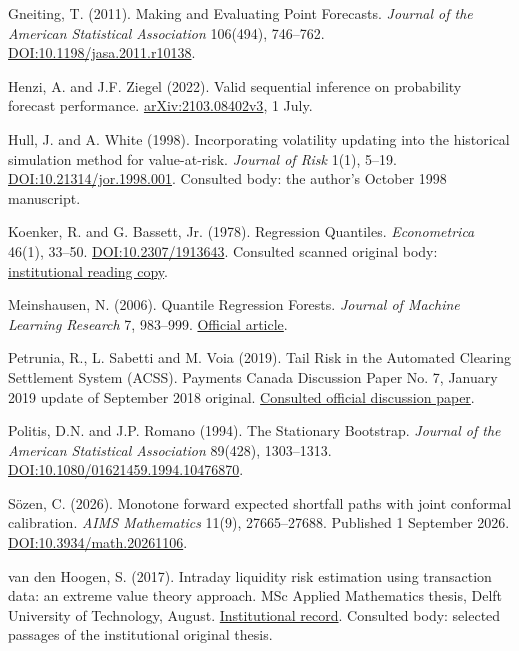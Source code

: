 \documentclass[10pt,a4paper]{article}
\begin{document}
Gneiting, T. (2011). Making and Evaluating Point Forecasts. \emph{Journal of the American Statistical Association} 106(494), 746–762. \href{https://doi.org/10.1198/jasa.2011.r10138}{DOI:10.1198/jasa.2011.r10138}.

Henzi, A. and J.F. Ziegel (2022). Valid sequential inference on probability forecast performance. \href{https://arxiv.org/abs/2103.08402v3}{arXiv:2103.08402v3}, 1 July.

Hull, J. and A. White (1998). Incorporating volatility updating into the historical simulation method for value-at-risk. \emph{Journal of Risk} 1(1), 5–19. \href{https://doi.org/10.21314/jor.1998.001}{DOI:10.21314/jor.1998.001}. Consulted body: the author's October 1998 manuscript.

Koenker, R. and G. Bassett, Jr. (1978). Regression Quantiles. \emph{Econometrica} 46(1), 33–50. \href{https://doi.org/10.2307/1913643}{DOI:10.2307/1913643}. Consulted scanned original body: \href{https://people.eecs.berkeley.edu/~jordan/sail/readings/koenker-bassett.pdf}{institutional reading copy}.

Meinshausen, N. (2006). Quantile Regression Forests. \emph{Journal of Machine Learning Research} 7, 983–999. \href{https://www.jmlr.org/papers/volume7/meinshausen06a/meinshausen06a.pdf}{Official article}.

Petrunia, R., L. Sabetti and M. Voia (2019). Tail Risk in the Automated Clearing Settlement System (ACSS). Payments Canada Discussion Paper No. 7, January 2019 update of September 2018 original. \href{https://www.paiements.ca/sites/default/files/tail_risk_in_the_automated_clearing_settlement_system_acss.pdf}{Consulted official discussion paper}.

Politis, D.N. and J.P. Romano (1994). The Stationary Bootstrap. \emph{Journal of the American Statistical Association} 89(428), 1303–1313. \href{https://doi.org/10.1080/01621459.1994.10476870}{DOI:10.1080/01621459.1994.10476870}.

Sözen, C. (2026). Monotone forward expected shortfall paths with joint conformal calibration. \emph{AIMS Mathematics} 11(9), 27665–27688. Published 1 September 2026. \href{https://www.aimspress.com/article/doi/10.3934/math.20261106}{DOI:10.3934/math.20261106}.

van den Hoogen, S. (2017). Intraday liquidity risk estimation using transaction data: an extreme value theory approach. MSc Applied Mathematics thesis, Delft University of Technology, August. \href{https://resolver.tudelft.nl/uuid:1c0c4545-bb07-4916-aa37-1d4bea3b7872}{Institutional record}. Consulted body: selected passages of the institutional original thesis.
\end{document}
